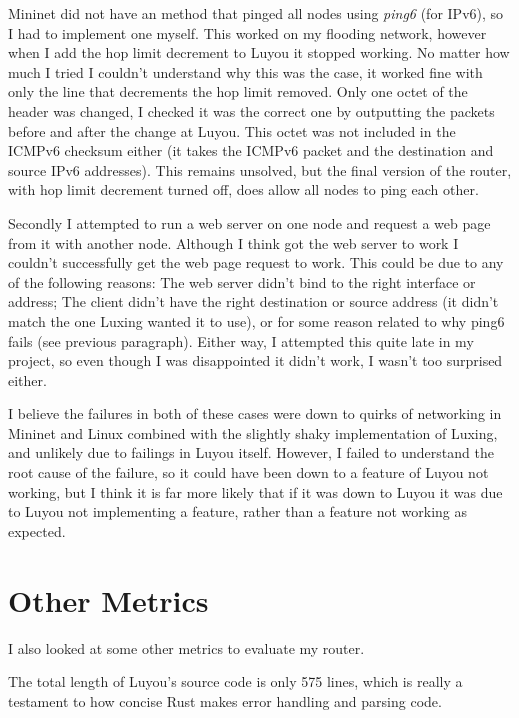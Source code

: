 \documentclass[12pt,a4paper,twoside,openright]{report}
\begin{document}
\bigskip

Mininet did not have an method that pinged all nodes using \textit{ping6} (for IPv6), so I had to implement one myself.  This worked on my flooding network, however when I add the hop limit decrement to Luyou it stopped working. No matter how much I tried I couldn't understand why this was the case, it worked fine with only the line that decrements the hop limit removed. Only one octet of the header was changed, I checked it was the correct one by outputting the packets before and after the change at Luyou.  This octet was not included in the ICMPv6 checksum either (it takes the ICMPv6 packet and the destination and source IPv6 addresses).  This remains unsolved, but the final version of the router, with hop limit decrement turned off, does allow all nodes to ping each other.

\bigskip

Secondly I attempted to run a web server on one node and request a web page from it with another node.  Although I think got the web server to work I couldn't successfully get the web page request to work.  This could be due to any of the following reasons: The web server didn't bind to the right interface or address;  The client didn't have the right destination or source address (it didn't match the one Luxing wanted it to use), or for some reason related to why ping6 fails (see previous paragraph).  Either way, I attempted this quite late in my project, so even though I was disappointed it didn't   work, I wasn't too surprised either.

\bigskip

I believe the failures in both of these cases were down to quirks of networking in Mininet and Linux combined with the slightly shaky implementation of Luxing, and unlikely due to failings in Luyou itself. However, I failed to understand the root cause of the failure, so it could have been down to a feature of Luyou not working, but I think it is far more likely that if it was down to Luyou it was due to Luyou not implementing a feature, rather than a feature not working as expected.

\section{Other Metrics}

I also looked at some other metrics to evaluate my router. 

\bigskip

The total length of Luyou's source code is only 575 lines, which is really a testament to how concise Rust makes error handling and parsing code.
\end{document}
